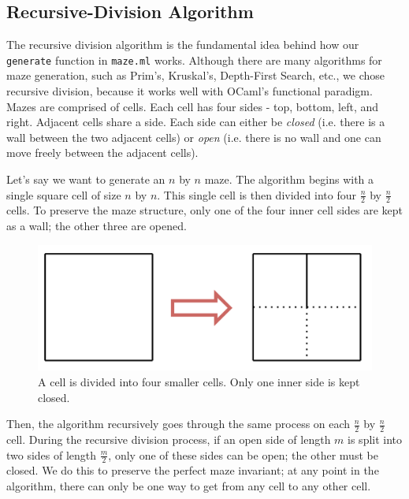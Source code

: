 \documentclass[11pt, margin=1in]{article}
\newcommand{\tab}{\par \qquad}
\begin{document}
\subsection{Recursive-Division Algorithm}  %
The recursive division algorithm is the fundamental idea behind how our \texttt{generate} function in \texttt{maze.ml} works.  Although there are many algorithms for maze generation, such as Prim's, Kruskal's, Depth-First Search, etc., we chose recursive division, because it works well with OCaml's functional paradigm.  Mazes are comprised of cells.  Each cell has four sides - top, bottom, left, and right.  Adjacent cells share a side.  Each side can either be \emph{closed} (i.e. there is a wall between the two adjacent cells) or \emph{open} (i.e. there is no wall and one can move freely between the adjacent cells).  
\tab Let's say we want to generate an $n$ by $n$ maze.  The algorithm begins with a single square cell of size $n$ by $n$.   This single cell is then divided into four $\frac{n}{2}$ by $\frac{n}{2}$ cells.  To preserve the maze structure, only one of the four inner cell sides are kept as a wall; the other three are opened.  

\begin{figure}[H]
\begin{center}
\includegraphics[scale=0.7]{gen1.jpg}
\end{center}
\caption{A cell is divided into four smaller cells.  Only one inner side is kept closed.}
\end{figure}     


Then, the algorithm recursively goes through the same process on each $\frac{n}{2}$ by $\frac{n}{2}$ cell.  During the recursive division process, if an open side of length $m$ is split into two sides of length $\frac{m}{2}$, only one of these sides can be open; the other must be closed.  We do this to preserve the perfect maze invariant; at any point in the algorithm, there can only be one way to get from any cell to any other cell.              
\end{document}
